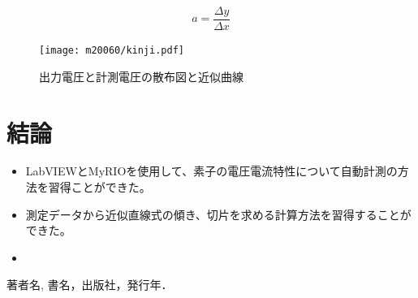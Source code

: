 \documentclass[11pt,dvipdfmx]{jarticle}
\begin{document}
	\begin{equation}
		a=\frac{\Delta y}{\Delta x}
		\label{katamuki}
	\end{equation}

	
	\begin{figure}[b]
		\centering
		\texttt{[image: m20060/kinji.pdf]}
		\caption{出力電圧と計測電圧の散布図と近似曲線}
		\label{fig:kinji}
	\end{figure}

\section{結論}
\begin{itemize}
	\item LabVIEWとMyRIOを使用して、素子の電圧電流特性について自動計測の方法を習得ことができた。
	\item 測定データから近似直線式の傾き、切片を求める計算方法を習得することができた。
	\item 
\end{itemize}

\begin{thebibliography}{9}%
	 著者名, 書名，出版社，発行年．
\end{thebibliography}
\end{document}
